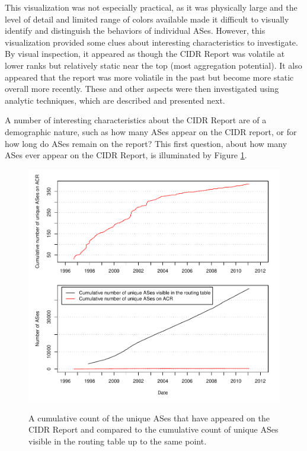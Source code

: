 This visualization was not especially practical, as it was physically large and
the level of detail and limited range of colors available made it difficult to
visually identify and distinguish the behaviors of individual ASes. However,
this visualization provided some clues about interesting characteristics to
investigate. By visual inspection, it appeared as though the CIDR Report was
volatile at lower ranks but relatively static near the top (most aggregation
potential). It also appeared that the report was more voliatile in the past but
become more static overall more recently. These and other aspects were then
investigated using analytic techniques, which are described and presented next.

A number of interesting characteristics about the CIDR Report are of a
demographic nature, such as how many ASes appear on the CIDR report, or for how
long do ASes remain on the report? This first question, about how many ASes
ever appear on the CIDR Report, is illuminated by Figure \ref{fig:as_counts}.

\begin{figure}[h!]
\begin{centering}
\begin{singlespace}
    \includegraphics[width=6in]{figures/cumulative_asn_counts.pdf}
    \vspace{-2em}\\
    \caption{A cumulative count of the unique ASes that have appeared on the
        CIDR Report and compared to the cumulative count of unique ASes visible
        in the routing table up to the same point.}
    \label{fig:as_counts}
\end{singlespace}
\end{centering}
\end{figure}

